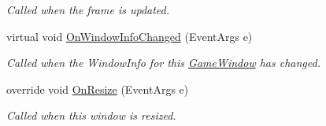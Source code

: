 \begin{DoxyCompactItemize}
\begin{DoxyCompactList}\small\item\em Called when the frame is updated. \end{DoxyCompactList}\item 
virtual void \hyperlink{class_open_t_k_1_1_game_window_a1b6723c6415c35586b23eabf5a9e51ca}{On\-Window\-Info\-Changed} (Event\-Args e)
\begin{DoxyCompactList}\small\item\em Called when the Window\-Info for this \hyperlink{class_open_t_k_1_1_game_window}{Game\-Window} has changed. \end{DoxyCompactList}\item 
override void \hyperlink{class_open_t_k_1_1_game_window_a730fe82126e7616bccba531bb2abc770}{On\-Resize} (Event\-Args e)
\begin{DoxyCompactList}\small\item\em Called when this window is resized. \end{DoxyCompactList}\end{DoxyCompactItemize}
